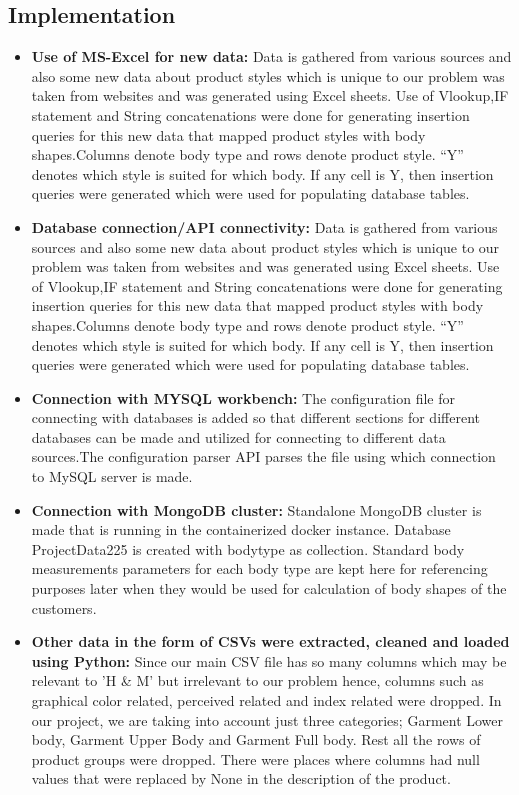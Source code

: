 \documentclass[11pt,journal,compsoc]{IEEEtran}
\begin{document}
\subsection{Implementation} 
\begin{itemize}
    \item[\ding{220}] \textbf{Use of MS-Excel for new data:} Data is gathered from various sources and also some new data about product styles which is unique to our problem was taken from websites and was generated using Excel sheets. Use of Vlookup,IF statement and String concatenations were done for generating insertion queries for this new data that mapped product styles with body shapes.Columns denote body type and rows denote product style. “Y” denotes which style is suited for which body. If any cell is Y, then insertion queries were generated which were used for populating database tables.\\
    \item[\ding{220}] \textbf{Database connection/API connectivity:} Data is gathered from various sources and also some new data about product styles which is unique to our problem was taken from websites and was generated using Excel sheets. Use of Vlookup,IF statement and String concatenations were done for generating insertion queries for this new data that mapped product styles with body shapes.Columns denote body type and rows denote product style. “Y” denotes which style is suited for which body. If any cell is Y, then insertion queries were generated which were used for populating database tables.\\
    \item[\ding{220}] \textbf{Connection with MYSQL workbench:} The configuration file for connecting with databases is added so that different sections for different databases can be made and utilized for connecting to different data sources.The configuration parser API parses the file using which connection to MySQL server is made.\\
    \item[\ding{220}] \textbf{Connection with MongoDB cluster:} Standalone MongoDB cluster is made that is running in the containerized docker instance. Database ProjectData225 is created with bodytype as collection. Standard body measurements parameters for each body type are kept here for referencing  purposes later when they would be used for calculation of body shapes of the customers.\\
    \item[\ding{220}] \textbf{Other data in the form of CSVs were extracted, cleaned and loaded using Python:} Since our main CSV file has so many columns which may be relevant to 'H \& M' but irrelevant to our problem hence, columns such as graphical color related, perceived related and index related were dropped. In our project, we are taking into account just three categories; Garment Lower body, Garment Upper Body and Garment Full body. Rest all the rows of product groups were dropped. There were places where columns had null values that were replaced by None in the description of the product.\\

\end{itemize}
\end{document}
